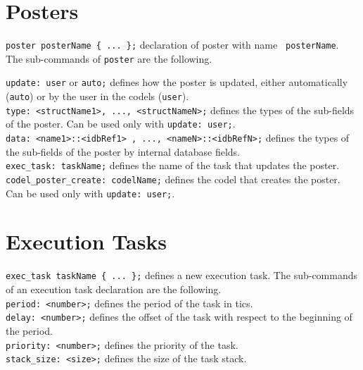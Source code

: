 \section{Posters}
\label{sec|posters}

{\tt poster posterName \{ ... \};} declaration of poster with name {\tt
  posterName}.\\

\noindent
The sub-commands of {\tt poster} are the following.

\noindent
{\tt update:  user} or {\tt auto;} defines how the poster is updated,
either automatically ({\tt auto}) or by the user in the codels ({\tt user}).\\

\noindent
{\tt type:  <structName1>, ..., <structNameN>;} defines the types of
the sub-fields of the poster. Can be used only with {\tt update:  user;}.\\

\noindent
{\tt data:  <name1>::<idbRef1> , ..., <nameN>::<idbRefN>;} defines the
types of the sub-fields of the poster by internal database fields.\\

\noindent
{\tt exec\_task:  taskName;} defines the name of the task that updates
the poster.\\

\noindent
{\tt codel\_poster\_create:  codelName;} defines the codel that creates
the poster. Can be used only with {\tt update:  user;}.\\

\section{Execution Tasks}
\label{sec|exec-task}

\noindent
{\tt exec\_task taskName \{ ... \};} defines a new execution task. The
sub-commands of an execution task declaration are the following.\\

\noindent
{\tt period:  <number>;} defines the period of the task in tics.\\

\noindent
{\tt delay:  <number>;} defines the offset of the task with respect to
the beginning of the period.\\

\noindent
{\tt priority:  <number>;} defines the priority of the task.\\

\noindent
{\tt stack\_size:  <size>;} defines the size of the task stack.\\

